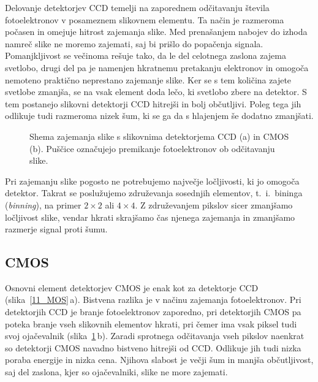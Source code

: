 Delovanje detektorjev CCD temelji na zaporednem odčitavanju števila fotoelektronov v posameznem 
slikovnem elementu. Ta način je razmeroma počasen in omejuje hitrost zajemanja slike. Med 
prenašanjem nabojev do izhoda namreč slike ne moremo zajemati, saj bi prišlo do popačenja signala. 
Pomanjkljivost se večinoma rešuje tako, da le del celotnega zaslona zajema svetlobo, drugi del
pa je namenjen hkratnemu pretakanju elektronov in omogoča nemoteno praktično neprestano zajemanje slike.
Ker se s tem količina zajete svetlobe zmanjša, se na vsak element doda lečo, ki svetlobo zbere
na detektor. S tem postanejo slikovni detektorji CCD hitrejši in bolj občutljivi. Poleg
tega jih odlikuje tudi razmeroma nizek šum, ki se ga da s hlajenjem še dodatno 
zmanjšati. 

\begin{figure}[h]
\centering
\def\svgwidth{100truemm} 

\caption{Shema zajemanja slike s slikovnima detektorjema CCD (a) in  CMOS (b). Puščice označujejo premikanje
fotoelektronov ob odčitavanju slike.}
\label{11_CCD}
\end{figure}

\begin{remark}
Pri zajemanju slike pogosto ne potrebujemo največje ločljivosti, ki jo omogoča detektor. 
Takrat se poslužujemo združevanja sosednjih elementov, t.\ i.\ bininga ({\it binning}), 
na primer $2\times2$ ali $4\times4$. Z združevanjem pikslov sicer zmanjšamo ločljivost slike, 
vendar hkrati skrajšamo čas njenega zajemanja in zmanjšamo razmerje signal proti šumu. 
\end{remark}

\subsection*{CMOS}
Osnovni element detektorjev CMOS je enak kot za detektorje CCD (slika~\ref{11_MOS}\,a). 
Bistvena razlika je v načinu zajemanja fotoelektronov. Pri detektorjih CCD je branje 
fotoelektronov zaporedno, pri detektorjih CMOS pa poteka branje vseh slikovnih elementov 
hkrati, pri čemer ima vsak piksel tudi svoj ojačevalnik (slika~\ref{11_CCD}\,b).
Zaradi sprotnega odčitavanja vseh pikslov naenkrat so detektorji CMOS navadno bistveno hitrejši 
od CCD. Odlikuje jih tudi nizka poraba energije in nizka cena. Njihova slabost
je večji šum in manjša občutljivost, saj del zaslona, kjer so ojačevalniki, slike ne more
zajemati. 

